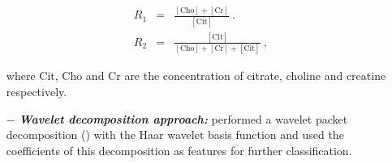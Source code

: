 \begin{enumerate}[leftmargin=*]
\begin{eqnarray}
	R_1 & = & \frac{ [ \text{Cho} ] + [ \text{Cr} ]}{[ \text{Cit} ]} \ . \label{eq:ratio1} \\
	R_2 & = & \frac{[ \text{Cit} ]}{[\text{Cho}]+[\text{Cr}]+[\text{Cit}]} \ , \label{eq:ratio2}
\end{eqnarray}

\noindent where $\text{Cit}$, $\text{Cho}$ and $\text{Cr}$ are the concentration of citrate, choline and creatine respectively.

\item[$-$] \textbf{\textit{Wavelet decomposition approach:}} \cite{Tiwari2012} performed a wavelet packet decomposition (\cite{Coifman1992}) with the Haar wavelet basis function and used the coefficients of this decomposition as features for further classification.

\end{enumerate}
